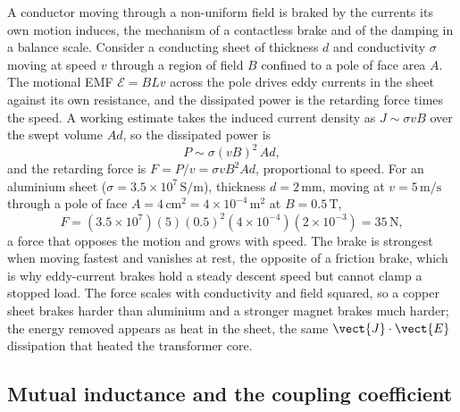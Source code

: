 A conductor moving through a non-uniform field is braked by the currents
its own motion induces, the mechanism of a contactless brake and of the
damping in a balance scale. Consider a conducting sheet of thickness $d$
and conductivity $\sigma$ moving at speed $v$ through a region of field
$B$ confined to a pole of face area $A$. The motional EMF $\mathcal{E} =
B L v$ across the pole drives eddy currents in the sheet against its own
resistance, and the dissipated power is the retarding force times the
speed. A working estimate takes the induced current density as
$J \sim \sigma v B$ over the swept volume $A d$, so the dissipated power
is
\[
P \sim \sigma (vB)^{2}\,A d,
\]
and the retarding force is $F = P/v = \sigma v B^{2} A d$, proportional to
speed. For an aluminium sheet ($\sigma = 3.5\times 10^{7}\,\si{\siemens
\per\meter}$), thickness $d = 2\,\si{\milli\meter}$, moving at $v = 5\,\si{
\meter\per\second}$ through a pole of face $A = 4\,\si{\centi\meter
\squared} = 4\times 10^{-4}\,\si{\meter\squared}$ at $B = 0.5\,\si{
\tesla}$,
\[
F = (3.5\times 10^{7})(5)(0.5)^{2}(4\times 10^{-4})(2\times 10^{-3})
= 35\,\si{\newton},
\]
a force that opposes the motion and grows with speed. The brake is
strongest when moving fastest and vanishes at rest, the opposite of a
friction brake, which is why eddy-current brakes hold a steady descent
speed but cannot clamp a stopped load. The force scales with conductivity
and field squared, so a copper sheet brakes harder than aluminium and a
stronger magnet brakes much harder; the energy removed appears as heat in
the sheet, the same $\vect{J}\cdot\vect{E}$ dissipation that heated the
transformer core.

\subsection{Mutual inductance and the coupling coefficient}

